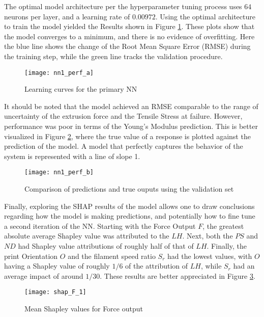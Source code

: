 \documentclass[main.tex]{subfiles}
\begin{document}
The optimal model architecture per the hyperparameter tuning process uses $64$ neurons per layer, and a learning rate of $0.00972$. Using the optimal architecture to train the model yielded the Results shown in Figure \ref{fig:nn1_p_a}. These plots show that the model converges to a minimum, and there is no evidence of overfitting. Here the blue line shows the change of the Root Mean Square Error (RMSE) during the training step, while the green line tracks the validation procedure. 

\begin{figure}[!htbp]
	\center
	\texttt{[image: nn1\_perf\_a]}
	\caption{Learning curves for the primary NN} \label{fig:nn1_p_a}
\end{figure}

It should be noted that the model achieved an RMSE comparable to the range of uncertainty of the extrusion force and the Tensile Stress at failure. However, performance was poor in terms of the Young's Modulus prediction. This is better visualized in Figure \ref{fig:nn1_p_b}, where the true value of a response is plotted against the prediction of the model. A model that perfectly captures the behavior of the system is represented with a line of slope 1.

\begin{figure}[!htbp]
	\center
	\texttt{[image: nn1\_perf\_b]}
	\caption{Comparison of predictions and true ouputs using the validation set} \label{fig:nn1_p_b}
\end{figure}

Finally, exploring the SHAP results of the model allows one to draw conclusions regarding how the model is making predictions, and potentially how to fine tune a second iteration of the NN. Starting with the Force Output $F$, the greatest absolute average Shapley value was attributed to the $LH$. Next, both the $PS$ and $ND$ had Shapley value attributions of roughly half of that of $LH$. Finally, the print Orientation $O$ and the filament speed ratio $S_r$ had the lowest values, with $O$ having a Shapley value of roughly $1/6$ of the attribution of $LH$, while $S_r$ had an average impact of around $1/30$. These results are better appreciated in Figure \ref{fig:nn1_shapF}. 

\begin{figure}[!htbp]
	\center
	\texttt{[image: shap\_F\_1]}
	\caption{Mean Shapley values for Force output} \label{fig:nn1_shapF}
\end{figure}
\end{document}
